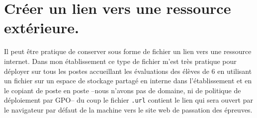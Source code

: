 \section{Créer un lien vers une ressource extérieure.}
Il peut être pratique de conserver sous forme de fichier un lien vers une ressource internet. 
Dans mon établissement ce type de fichier m'est très pratique pour déployer sur tous les postes accueillant les évaluations des élèves de 6\ieme{} en utilisant un fichier sur un espace de stockage partagé en interne dans l'établissement et en le copiant de poste en poste --nous n'avons pas de domaine, ni de politique de déploiement par GPO-- du coup le fichier \texttt{.url} contient le lien qui sera ouvert par le navigateur par défaut de la machine vers le site web de passation des épreuves. 

